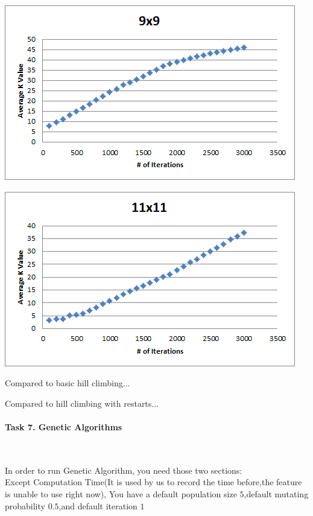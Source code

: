 \documentclass[12pt, letterpaper]{article}
\begin{document}
\includegraphics[width=\linewidth]{"Task 6/9x9 Scatterplot"}

\includegraphics[width=\linewidth]{"Task 6/11x11 Scatterplot"}

Compared to basic hill climbing...

Compared to hill climbing with restarts...

\pagebreak
\paragraph{Task 7. Genetic Algorithms} \mbox{}\\

	\begin{large}
		In order to run Genetic Algorithm, you need those two sections:\\
		Except Computation Time(It is used by us to record the time before,the feature is unable to use right now), You have a default population size $5$,default mutating probability $0.5$,and default iteration $1$ \\
	\end{large} 
	
\end{document}
